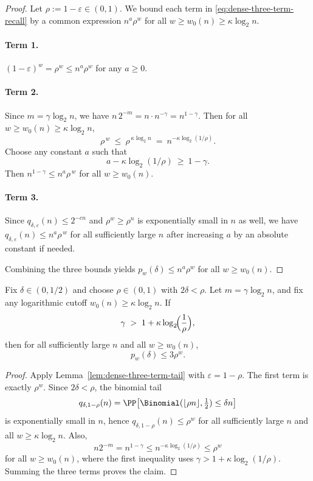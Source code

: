 \begin{proof}
Let $\rho:=1-\varepsilon\in(0,1)$.
We bound each term in \eqref{eq:dense-three-term-recall} by a common expression $n^a\rho^w$ for all
$w\ge w_0(n)\ge \kappa\log_2 n$.

\paragraph{Term 1.}
$(1-\varepsilon)^w=\rho^w\le n^a\rho^w$ for any $a\ge 0$.

\paragraph{Term 2.}
Since $m=\gamma\log_2 n$, we have $n\,2^{-m}=n\cdot n^{-\gamma}=n^{1-\gamma}$.
Then for all $w\ge w_0(n)\ge \kappa\log_2 n$,
\[
\rho^{\,w}\ \le\ \rho^{\,\kappa\log_2 n}
\ =\ n^{-\kappa\log_2(1/\rho)}.
\]
Choose any constant $a$ such that
\[
a - \kappa\log_2(1/\rho)\ \ge\ 1-\gamma.
\]
Then $n^{1-\gamma}\le n^{a}\rho^{\,w}$ for all $w\ge w_0(n)$.

\paragraph{Term 3.}
Since $q_{\delta,\varepsilon}(n)\le 2^{-cn}$ and $\rho^w\ge \rho^n$ is exponentially small in $n$ as well,
we have $q_{\delta,\varepsilon}(n)\le n^{a}\rho^{\,w}$ for all sufficiently large $n$ after increasing $a$ by an absolute constant if needed.

Combining the three bounds yields $p_w(\delta)\le n^a\rho^w$ for all $w\ge w_0(n)$.
\end{proof}

\begin{corollary}
\label{cor:dense-inner-constant-geometric}
Fix \(\delta\in(0,1/2)\) and choose \(\rho\in(0,1)\) with \(2\delta<\rho\).
Let \(m=\gamma\log_2 n\), and fix any logarithmic cutoff \(w_0(n)\ge \kappa\log_2 n\).
If
\[
\gamma \;>\; 1+\kappa\log_2\!\Bigl(\frac{1}{\rho}\Bigr),
\]
then for all sufficiently large \(n\) and all \(w\ge w_0(n)\),
\[
p_w(\delta)\le 3\rho^w.
\]
\end{corollary}

\begin{proof}
Apply Lemma~\ref{lem:dense-three-term-tail} with \(\varepsilon=1-\rho\).
The first term is exactly \(\rho^w\).
Since \(2\delta<\rho\), the binomial tail
\[
q_{\delta,1-\rho}(n)
=
\PP\!\left[\Binomial(\lfloor \rho n\rfloor,\tfrac12)\le \delta n\right]
\]
is exponentially small in \(n\), hence \(q_{\delta,1-\rho}(n)\le \rho^w\) for all sufficiently large \(n\) and all
\(w\ge \kappa\log_2 n\).
Also,
\[
n2^{-m}=n^{1-\gamma}
\le
n^{-\kappa\log_2(1/\rho)}
\le
\rho^w
\]
for all \(w\ge w_0(n)\), where the first inequality uses
\(\gamma>1+\kappa\log_2(1/\rho)\).
Summing the three terms proves the claim.
\end{proof}

